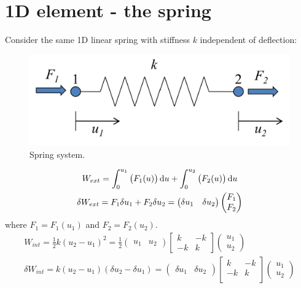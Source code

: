 \section{1D element - the spring}
Consider the same 1D linear spring with stiffness $k$ independent of deflection:
\begin{figure}[H]
	\centering
	\includegraphics[width = \textwidth]{./img/figure5.png}
	\caption{Spring system.}
\end{figure}
\begin{gather}
	W_{ext} = \int_0^{u_1} \left(F_1(u)\right)\dif u + \int_{0}^{u_2} \left(F_2(u)\right)\dif u\\
	\delta W_{ext} = F_1 \delta u_1 + F_2 \delta u_2 = \begin{pmatrix}
		\delta u_1 & \delta u_2 
	\end{pmatrix} \begin{pmatrix}
		F_1\\
		F_2
	\end{pmatrix}
\end{gather}
where $F_1 = F_1\left(u_1\right)$ and $F_2 = F_2\left(u_2\right)$.
\begin{gather}
	W_{int} = \frac{1}{2}k\left(u_2- u_1\right)^2 = \frac{1}{2}\begin{pmatrix}
		u_1 & u_2
	\end{pmatrix}\begin{bmatrix}
		k & -k\\
		-k & k
	\end{bmatrix}\begin{pmatrix}
		u_1\\
		u_2
	\end{pmatrix}\\
	\delta W_{int} = k\left(u_2 - u_1\right)\left(\delta u_2 -\delta u_1\right) = \begin{pmatrix}
		\delta u_1 & \delta u_2
	\end{pmatrix}\begin{bmatrix}
		k & -k\\
		-k & k\\
	\end{bmatrix}\begin{pmatrix}
		u_1\\
		u_2
	\end{pmatrix}
\end{gather}
